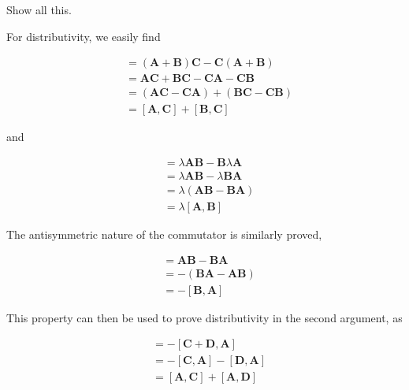 \documentclass[../the-road-to-reality.tex]{subfiles}
\begin{document}
\begin{questions}
\question Show all this.

\begin{solution}
        For distributivity, we easily find

        \begin{align*}
                [\mathbf{A} + \mathbf{B}, \mathbf{C}] &= (\mathbf{A} + \mathbf{B})\mathbf{C} - \mathbf{C}(\mathbf{A} + \mathbf{B}) \\
                &= \mathbf{AC} + \mathbf{BC} - \mathbf{CA} - \mathbf{CB} \\
                &= (\mathbf{AC} - \mathbf{CA}) + (\mathbf{BC} - \mathbf{CB}) \\
                &= [\mathbf{A}, \mathbf{C}] + [\mathbf{B}, \mathbf{C}]
        \end{align*}

        and

        \begin{align*}
                [\lambda\mathbf{A}, \mathbf{B}] &= \lambda\mathbf{AB} - \mathbf{B}\lambda\mathbf{A} \\
                &= \lambda\mathbf{AB} - \lambda\mathbf{BA} \\
                &= \lambda(\mathbf{AB} - \mathbf{BA}) \\
                &= \lambda[\mathbf{A}, \mathbf{B}]
        \end{align*}

        The antisymmetric nature of the commutator is similarly proved,

        \begin{align*}
                [\mathbf{A}, \mathbf{B}] &= \mathbf{AB} - \mathbf{BA} \\
                &= -(\mathbf{BA} - \mathbf{AB}) \\
                &= -[\mathbf{B}, \mathbf{A}]
        \end{align*}

        This property can then be used to prove distributivity in the second argument, as

        \begin{align*}
                [\mathbf{A}, \mathbf{C} + \mathbf{D}] &= -[\mathbf{C} + \mathbf{D}, \mathbf{A}] \\
                &= -[\mathbf{C},\mathbf{A}] - [\mathbf{D}, \mathbf{A}] \\
                &= [\mathbf{A}, \mathbf{C}] + [\mathbf{A}, \mathbf{D}]
        \end{align*}


\end{solution}
\end{questions}
\end{document}

